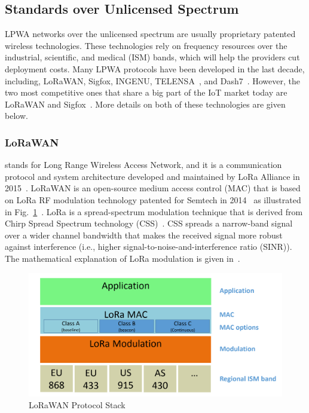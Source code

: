 \documentclass[]{IEEEtran}
\begin{document}
\subsection{Standards over Unlicensed Spectrum}
\label{sec:2-1}

LPWA networks over the unlicensed spectrum are usually proprietary patented wireless technologies.
These technologies rely on frequency resources over the industrial, scientific, and medical (ISM) bands, which will help the providers cut deployment costs.
Many LPWA protocols have been developed in the last decade, including, LoRaWAN, Sigfox\cite{ayoub2018internet}, INGENU\cite{ogbodo2022survey}, TELENSA~\cite{raza2017low}, and Dash7~\cite{augustin2016study}.
However, the two most competitive ones that share a big part of the IoT market today are LoRaWAN and Sigfox~\cite{ding_iot_2020}.
More details on both of these technologies are given below.

\subsubsection{LoRaWAN}
\label{sec:2-1-1}

stands for Long Range Wireless Access Network, and it is a communication protocol and system architecture developed and maintained by LoRa Alliance in 2015~\cite{LoRaWAN_spec}.
LoRaWAN is an open-source medium access control (MAC) that is based on LoRa RF modulation technology patented for Semtech in 2014~\cite{seller_low_2016} as illustrated in Fig.~\ref{fig:LoRaWAN-stack}~\cite{LoRaWAN_spec}.
LoRa is a spread-spectrum modulation technique that is derived from  Chirp Spread Spectrum technology (CSS)~\cite{sforza_communications_2013}.
CSS spreads a narrow-band signal over a wider channel bandwidth that makes the received signal more robust against interference (i.e., higher signal-to-noise-and-interference ratio (SINR)).
The mathematical explanation of LoRa modulation is given in~\cite{vangelista2017frequency}.


\begin{figure}
    \centering
        \includegraphics[width=\linewidth]{Pictures/LoRaWAN_stack.png}
    \caption{LoRaWAN Protocol Stack}
    \label{fig:LoRaWAN-stack}
\end{figure}
\end{document}
